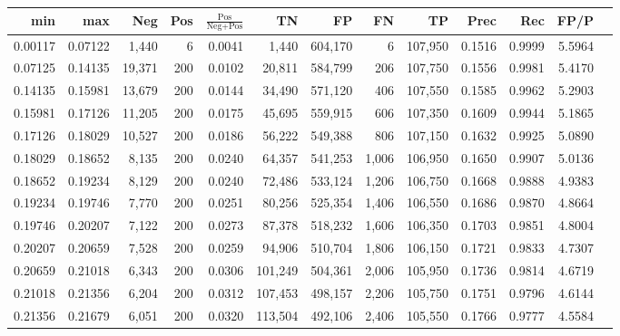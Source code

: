 \begin{tabular}{rrrrrrrrrrrrr}
\toprule
    min &     max &    Neg & Pos & $\frac{\text{Pos}}{\text{Neg}+\text{Pos}}$ &      TN &      FP &      FN &      TP &   Prec &    Rec &   FP/P \\
\midrule
0.00117 & 0.07122 &  1,440 &   6 &                                     0.0041 &   1,440 & 604,170 &       6 & 107,950 & 0.1516 & 0.9999 & 5.5964 \\
0.07125 & 0.14135 & 19,371 & 200 &                                     0.0102 &  20,811 & 584,799 &     206 & 107,750 & 0.1556 & 0.9981 & 5.4170 \\
0.14135 & 0.15981 & 13,679 & 200 &                                     0.0144 &  34,490 & 571,120 &     406 & 107,550 & 0.1585 & 0.9962 & 5.2903 \\
0.15981 & 0.17126 & 11,205 & 200 &                                     0.0175 &  45,695 & 559,915 &     606 & 107,350 & 0.1609 & 0.9944 & 5.1865 \\
0.17126 & 0.18029 & 10,527 & 200 &                                     0.0186 &  56,222 & 549,388 &     806 & 107,150 & 0.1632 & 0.9925 & 5.0890 \\
0.18029 & 0.18652 &  8,135 & 200 &                                     0.0240 &  64,357 & 541,253 &   1,006 & 106,950 & 0.1650 & 0.9907 & 5.0136 \\
0.18652 & 0.19234 &  8,129 & 200 &                                     0.0240 &  72,486 & 533,124 &   1,206 & 106,750 & 0.1668 & 0.9888 & 4.9383 \\
0.19234 & 0.19746 &  7,770 & 200 &                                     0.0251 &  80,256 & 525,354 &   1,406 & 106,550 & 0.1686 & 0.9870 & 4.8664 \\
0.19746 & 0.20207 &  7,122 & 200 &                                     0.0273 &  87,378 & 518,232 &   1,606 & 106,350 & 0.1703 & 0.9851 & 4.8004 \\
0.20207 & 0.20659 &  7,528 & 200 &                                     0.0259 &  94,906 & 510,704 &   1,806 & 106,150 & 0.1721 & 0.9833 & 4.7307 \\
0.20659 & 0.21018 &  6,343 & 200 &                                     0.0306 & 101,249 & 504,361 &   2,006 & 105,950 & 0.1736 & 0.9814 & 4.6719 \\
0.21018 & 0.21356 &  6,204 & 200 &                                     0.0312 & 107,453 & 498,157 &   2,206 & 105,750 & 0.1751 & 0.9796 & 4.6144 \\
0.21356 & 0.21679 &  6,051 & 200 &                                     0.0320 & 113,504 & 492,106 &   2,406 & 105,550 & 0.1766 & 0.9777 & 4.5584 \\

\end{tabular}
